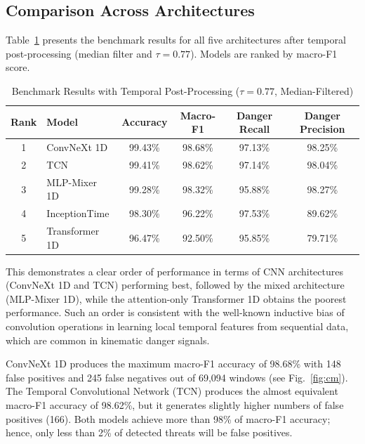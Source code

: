 \documentclass[letterpaper,journal]{IEEEtran}
\begin{document}
\subsection{Comparison Across Architectures}

Table~\ref{tab:results} presents the benchmark results for all five architectures after temporal post-processing (median filter and $\tau = 0.77$). Models are ranked by macro-F1 score.

\begin{table}[!t]
    \centering
    \caption{Benchmark Results with Temporal Post-Processing ($\tau = 0.77$, Median-Filtered)}
    \label{tab:results}
    \begin{tabular}{clcccc}
        \toprule
        \textbf{Rank} & \textbf{Model} & \textbf{Accuracy} & \textbf{Macro-F1} & \textbf{Danger Recall} & \textbf{Danger Precision} \\
        \midrule
        1             & ConvNeXt 1D    & 99.43\%           & 98.68\%           & 97.13\%                & 98.25\%                   \\
        2             & TCN            & 99.41\%           & 98.62\%           & 97.14\%                & 98.04\%                   \\
        3             & MLP-Mixer 1D   & 99.28\%           & 98.32\%           & 95.88\%                & 98.27\%                   \\
        4             & InceptionTime  & 98.30\%           & 96.22\%           & 97.53\%                & 89.62\%                   \\
        5             & Transformer 1D & 96.47\%           & 92.50\%           & 95.85\%                & 79.71\%                   \\
        \bottomrule
    \end{tabular}
\end{table}

This demonstrates a clear order of performance in terms of CNN architectures (ConvNeXt 1D and TCN) performing best, followed by the mixed architecture (MLP-Mixer 1D), while the attention-only Transformer 1D obtains the poorest performance. Such an order is consistent with the well-known inductive bias of convolution operations in learning local temporal features from sequential data, which are common in kinematic danger signals.

ConvNeXt 1D produces the maximum macro-F1 accuracy of 98.68\% with 148 false positives and 245 false negatives out of 69,094 windows (see Fig.~\ref{fig:cm}). The Temporal Convolutional Network (TCN) produces the almost equivalent macro-F1 accuracy of 98.62\%, but it generates slightly higher numbers of false positives (166). Both models achieve more than 98\% of macro-F1 accuracy; hence, only less than 2\% of detected threats will be false positives.
\end{document}
